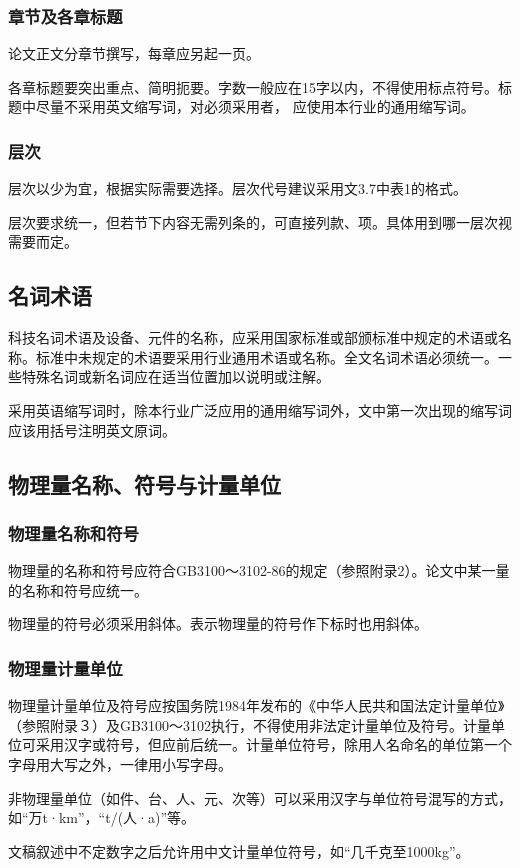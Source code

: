 \subsubsection{章节及各章标题}
论文正文分章节撰写，每章应另起一页。

各章标题要突出重点、简明扼要。字数一般应在15字以内，不得使用标点符号。标题中尽量不采用英文缩写词，对必须采用者， 应使用本行业的通用缩写词。
\subsubsection{层次}

层次以少为宜，根据实际需要选择。层次代号建议采用文3.7中表1的格式。

层次要求统一，但若节下内容无需列条的，可直接列款、项。具体用到哪一层次视需要而定。

\subsection{名词术语}
科技名词术语及设备、元件的名称，应采用国家标准或部颁标准中规定的术语或名称。标准中未规定的术语要采用行业通用术语或名称。全文名词术语必须统一。一些特殊名词或新名词应在适当位置加以说明或注解。

采用英语缩写词时，除本行业广泛应用的通用缩写词外，文中第一次出现的缩写词应该用括号注明英文原词。
\subsection{物理量名称、符号与计量单位}
\subsubsection{物理量名称和符号}
物理量的名称和符号应符合GB3100～3102-86的规定（参照附录2）。论文中某一量的名称和符号应统一。

物理量的符号必须采用斜体。表示物理量的符号作下标时也用斜体。
\subsubsection{物理量计量单位}
物理量计量单位及符号应按国务院1984年发布的《中华人民共和国法定计量单位》（参照附录３）及GB3100～3102执行，不得使用非法定计量单位及符号。计量单位可采用汉字或符号，但应前后统一。计量单位符号，除用人名命名的单位第一个字母用大写之外，一律用小写字母。

非物理量单位（如件、台、人、元、次等）可以采用汉字与单位符号混写的方式，如“万t·km”，“t/(人·a)”等。

文稿叙述中不定数字之后允许用中文计量单位符号，如“几千克至1000kg”。

